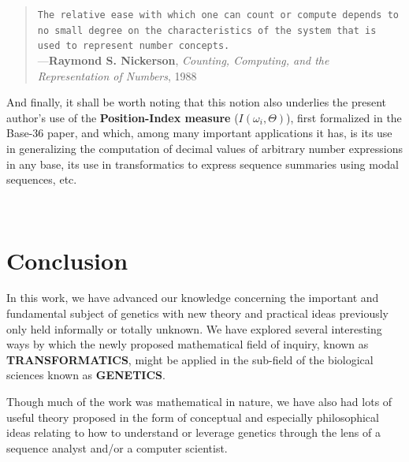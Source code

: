 \documentclass[a4paper, 18pt]{book} %
\begin{document}
\begin{center}
{\begin{minipage}{0.9\textwidth}
\begin{quotation}
\noindent \texttt{The relative ease with which one can count or compute depends to no small degree on the characteristics of the system that is used to represent number concepts.}\\

\hspace*{\fill} ---\textbf{Raymond S. Nickerson}, \textit{Counting, Computing, and the Representation of Numbers}, 1988\cite{nickerson1988counting}
\end{quotation}

And finally, it shall be worth noting that this notion also underlies the present author's use of the \textbf{Position-Index measure} ($I(\omega_i, \Theta)$), first formalized in the Base-36 paper\cite{base36paper}, and which, among many important applications it has, is its use in generalizing the computation of decimal values of arbitrary number expressions in any base, its use in transformatics to express sequence summaries using modal sequences\cite{transformatics}, etc.

\end{minipage}}
\\
\end{center}


\chapter{Conclusion}
\label{CONC}

In this work, we have advanced our knowledge concerning the important and fundamental subject of genetics with new theory and practical ideas previously only held informally or totally unknown. We have explored several interesting ways by which the newly proposed mathematical field of inquiry, known as \textbf{TRANSFORMATICS}, might be applied in the sub-field of the biological sciences known as \textbf{GENETICS}. 

Though much of the work was mathematical in nature, we have also had lots of useful theory proposed in the form of conceptual and especially philosophical ideas relating to how to understand or leverage genetics through the lens of a sequence analyst and/or a computer scientist. 
\end{document}
